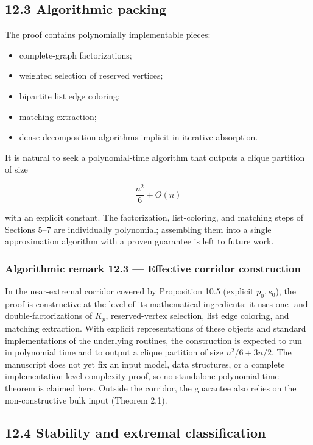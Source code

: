\documentclass[
  american,
  11pt,
  a4paper,
]{article}
\providecommand{\tightlist}{%
  \setlength{\itemsep}{0pt}\setlength{\parskip}{0pt}}
\begin{document}
\subsection{12.3 Algorithmic packing}\label{algorithmic-packing}

The proof contains polynomially implementable pieces:

\begin{itemize}
\tightlist
\item
  complete-graph factorizations;
\item
  weighted selection of reserved vertices;
\item
  bipartite list edge coloring;
\item
  matching extraction;
\item
  dense decomposition algorithms implicit in iterative absorption.
\end{itemize}

It is natural to seek a polynomial-time algorithm that outputs a clique partition of size

\[
\frac{n^2}{6}+O(n)
\]

with an explicit constant. The factorization, list-coloring, and matching steps of Sections 5--7 are individually polynomial; assembling them into a single approximation algorithm with a proven guarantee is left to future work.

\subsubsection{Algorithmic remark 12.3 --- Effective corridor construction}\label{algorithmic-remark-12.3-effective-corridor-construction}

In the near-extremal corridor covered by Proposition 10.5 (explicit \(p_0,s_0\)), the proof is constructive at the level of its mathematical ingredients: it uses one- and double-factorizations of \(K_p\), reserved-vertex selection, list edge coloring, and matching extraction. With explicit representations of these objects and standard implementations of the underlying routines, the construction is expected to run in polynomial time and to output a clique partition of size \(n^2/6+3n/2\). The manuscript does not yet fix an input model, data structures, or a complete implementation-level complexity proof, so no standalone polynomial-time theorem is claimed here. Outside the corridor, the guarantee also relies on the non-constructive bulk input (Theorem 2.1).

\subsection{12.4 Stability and extremal classification}\label{stability-and-extremal-classification}
\end{document}
